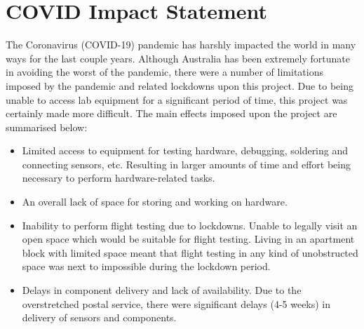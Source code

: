 

\chapter*{COVID Impact Statement}\label{COVIDStatement}

The Coronavirus (COVID-19) pandemic has harshly impacted the world in many ways for the last couple years. Although Australia has been extremely fortunate in avoiding the worst of the pandemic, there were a number of limitations imposed by the pandemic and related lockdowns upon this project. Due to being unable to access lab equipment for a significant period of time, this project was certainly made more difficult. The main effects imposed upon the project are summarised below:
\begin{itemize}
  \item Limited access to equipment for testing hardware, debugging, soldering and connecting sensors, etc. Resulting in larger amounts of time and effort being necessary to perform hardware-related tasks.
  \item An overall lack of space for storing and working on hardware.
  \item Inability to perform flight testing due to lockdowns. Unable to legally visit an open space which would be suitable for flight testing. Living in an apartment block with limited space meant that flight testing in any kind of unobstructed space was next to impossible during the lockdown period.
	\item Delays in component delivery and lack of availability. Due to the overstretched postal service,  there were significant delays (4-5 weeks) in delivery of sensors and components.
\end{itemize}

\clearpage


